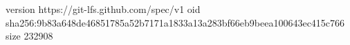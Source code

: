 version https://git-lfs.github.com/spec/v1
oid sha256:9b83a648de46851785a52b7171a1833a13a283bf66eb9beea100643ec415c766
size 232908
